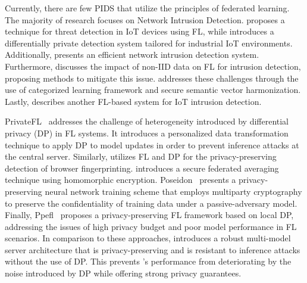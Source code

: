 Currently, there are few PIDS that utilize the principles of federated learning. The majority of research focuses on Network Intrusion Detection. \cite{man2021intelligent} proposes a technique for threat detection in IoT devices using FL, while \cite{friha20232df} introduces a differentially private detection system tailored for industrial IoT environments. Additionally, \cite{li2023efficient} presents an efficient network intrusion detection system. Furthermore, \cite{guo2023new} discusses the impact of non-IID data on FL for intrusion detection, proposing methods to mitigate this issue.  \Sys addresses these challenges through the use of categorized \gnnshort learning framework and secure semantic vector harmonization. Lastly, \cite{chaabene2023privacy} describes another FL-based system for IoT intrusion detection.

 PrivateFL~\cite{yang2023privatefl} addresses the challenge of heterogeneity introduced by differential privacy (DP) in FL systems. It introduces a personalized data transformation technique to apply DP to model updates in order to prevent inference attacks at the central server. Similarly, \cite{annamalai2023fp} utilizes FL and DP for the privacy-preserving detection of browser fingerprinting. \cite{dasu2022prov} introduces a secure federated averaging technique using homomorphic encryption. Poseidon~\cite{sav2020poseidon} presents a privacy-preserving neural network training scheme that employs multiparty cryptography to preserve the confidentiality of training data under a passive-adversary model. Finally, Ppefl~\cite{wang2023ppefl} proposes a privacy-preserving FL framework based on local DP, addressing the issues of high privacy budget and poor model performance in FL scenarios. In comparison to these approaches, \Sys introduces a robust multi-model server architecture that is privacy-preserving and is resistant to inference attacks without the use of DP. This prevents \Sys's performance from deteriorating by the noise introduced by DP while offering strong privacy guarantees.
 










